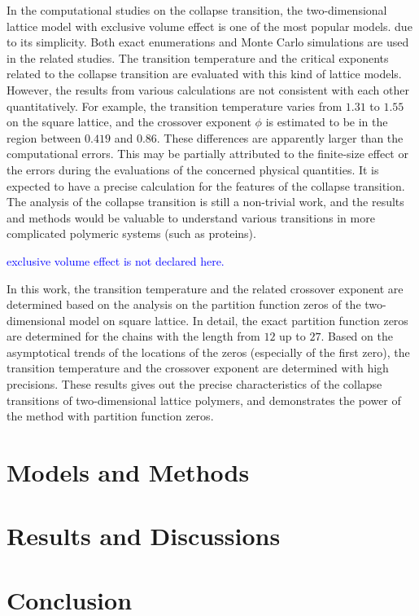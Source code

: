 \documentclass[preprint,preprintnumbers,amsmath,amssymb,showpacs,pre]{revtex4-1}
\begin{document}
In the computational studies on the collapse transition, the two-dimensional
lattice model with exclusive volume effect is one of the most popular models.
due to its simplicity. Both exact enumerations and Monte Carlo simulations
are used in the related studies. The transition temperature and the
critical exponents related to the collapse transition are evaluated with
this kind of lattice models. However, the results from various calculations
are not consistent with each other quantitatively. For example, the transition
temperature varies from $1.31$ to $1.55$ on the square lattice, and the
crossover exponent $\phi$ is estimated to be in the region between $0.419$
and $0.86$. These differences are apparently larger than the computational
errors.
This may be partially attributed to the finite-size effect or the errors
during the evaluations of the concerned physical quantities. It is expected
to have a precise calculation for the features of the collapse transition.
The analysis of the collapse transition is still a non-trivial work, and
the results and methods would be valuable to understand various transitions
in more complicated polymeric systems (such as proteins).

\textcolor{blue}{exclusive volume effect is not declared here.}

In this work, the transition temperature and the related crossover exponent
are determined based on the analysis on the partition function zeros of
the two-dimensional model on square lattice. In detail, the exact
partition function zeros are determined for the chains with the length
from $12$ up to $27$. Based on the asymptotical trends of the locations of 
the zeros (especially of the first zero), the transition temperature
and the crossover exponent are determined with high precisions. These
results gives out the precise characteristics of the collapse transitions
of two-dimensional lattice polymers, and demonstrates the power of the
method with partition function zeros.

\section{Models and Methods}

\section{Results and Discussions}

\section{Conclusion}
\end{document}
